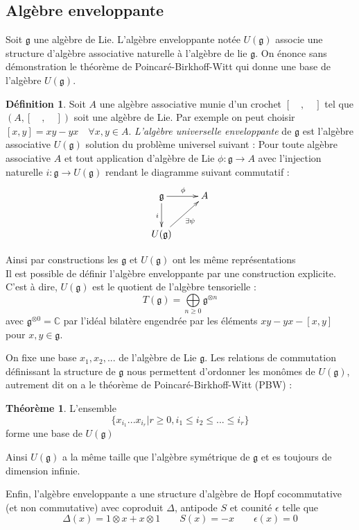 \documentclass[12pt]{article}
\theoremstyle{definition}
\newtheorem{theo}{Théorème}[section]
\newtheorem{Def}{Définition}[section]
\begin{document}
\subsection{Algèbre enveloppante}
Soit $\mathfrak{g}$ une algèbre de Lie. L'algèbre enveloppante notée $U(\mathfrak{g})$ associe une structure d'algèbre associative naturelle à l'algèbre de lie $\mathfrak{g}$. On énonce sans démonstration le théorème de Poincaré-Birkhoff-Witt qui donne une base de l'algèbre $U(\mathfrak{g})$. 
\begin{Def} Soit $A$ une algèbre associative munie d'un crochet $[\quad,\quad]$ tel que $(A,[\quad,\quad])$ soit une algèbre de Lie. Par exemple on peut choisir $[x,y]=xy-yx\quad\forall x,y\in A$. \textit{L'algèbre universelle enveloppante} de $\mathfrak{g}$ est l'algèbre associative $U(\mathfrak{g})$ solution du problème universel suivant : Pour toute algèbre associative $A$ et tout application d'algèbre de Lie $\phi : \mathfrak{g}\to A$ avec l'injection naturelle $i:\mathfrak{g}\to U(\mathfrak{g})$ rendant le diagramme suivant commutatif : $$\xymatrix{
    \mathfrak{g} \ar[r]^{\phi} \ar[d]_i  & A \\
    U(\mathfrak{g}) \ar[ru]_{\exists\psi} 
  }$$
  \end{Def}
Ainsi par constructions les $\mathfrak{g}$ et $U(\mathfrak{g})$ ont les même représentations\\ Il est possible de définir l'algèbre enveloppante par une construction explicite. C'est à dire, $U(\mathfrak{g})$ est le quotient de l'algèbre tensorielle : $$T(\mathfrak{g})=\underset{n\geqslant 0}{\bigoplus}\mathfrak{g}^{\otimes n}$$ avec $\mathfrak{g}^{\otimes 0}=\mathbb{C}$ par l'idéal bilatère engendrée par les éléments $xy-yx-[x,y]$ pour $x,y\in\mathfrak{g}$.

On fixe une base $x_1, x_2,...$ de l'algèbre de Lie $\mathfrak{g}$. Les relations de commutation définissant la structure de $\mathfrak{g}$ nous permettent d'ordonner les monômes de $U(\mathfrak{g})$, autrement dit on a le théorème de Poincaré-Birkhoff-Witt (PBW) :
\begin{theo}\label{PBW} L'ensemble $$\{x_{i_1}...x_{i_r}\vert r\geqslant 0, i_1\leqslant i_2\leqslant ...\leqslant i_r\}$$ forme une base de $U(\mathfrak{g})$ \end{theo} Ainsi $U(\mathfrak{g})$ a la même taille que l'algèbre symétrique de $\mathfrak{g}$  et es toujours de dimension infinie.

Enfin, l'algèbre enveloppante a une structure d'algèbre de Hopf cocommutative (et non commutative) avec coproduit $\Delta$, antipode $S$ et counité $\epsilon$ telle que \begin{equation*}\Delta(x)=1\otimes x+x\otimes 1\qquad S(x)=-x\qquad \epsilon(x) =0 
\end{equation*}
\end{document}
